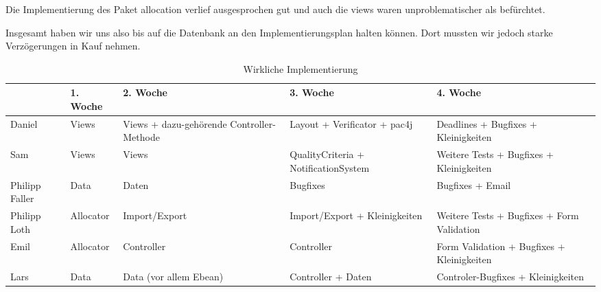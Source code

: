 \documentclass[parskip=full]{scrartcl}
\newcommand{\code}[1]{{\ttfamily #1}}
\begin{document}
Die Implementierung des Paket \code{allocation} verlief ausgesprochen gut und auch die \code{views} waren unproblematischer als befürchtet. 

Insgesamt haben wir uns also bis auf die Datenbank an den Implementierungsplan halten können. Dort mussten wir jedoch starke Verzögerungen in Kauf nehmen.




\begin{table}[H]
\begin{tabularx}{\textwidth}{|l|l|X|X|X|}
\hline
 	& 1. Woche			& 2. Woche		& 3. Woche & 4. Woche\\
\hline 
Daniel	& Views			& Views + dazu-gehörende Controller-Methode & Layout + Verificator
+ pac4j&Deadlines + Bugfixes +
Kleinigkeiten \\
\hline
Sam & Views&Views& QualityCriteria +
NotificationSystem & Weitere Tests +
Bugfixes +
Kleinigkeiten\\
\hline
Philipp Faller&Data&Daten&Bugfixes&Bugfixes +  Email\\
\hline
Philipp Loth&Allocator&Import/Export
&Import/Export + Kleinigkeiten &Weitere Tests +
Bugfixes +
Form Validation\\
\hline
Emil&Allocator&Controller&Controller&Form Validation +
Bugfixes +
Kleinigkeiten\\
\hline
Lars&Data&Data (vor allem
Ebean)&Controller + Daten &
Controler-Bugfixes +
Kleinigkeiten\\
\hline
\end{tabularx}
\caption{Wirkliche Implementierung}
\end{table}
\end{document}
